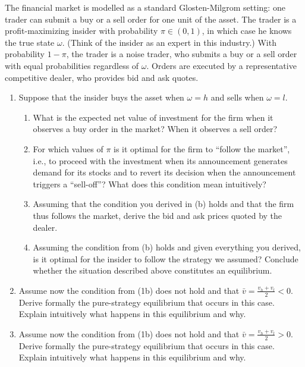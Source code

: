 	The financial market is modelled as a standard Glosten-Milgrom setting: one trader can submit a buy or a sell order for one unit of the asset. The trader is a profit-maximizing insider with probability $\pi \in (0,1)$, in which case he knows the true state $\omega$. (Think of the insider as an expert in this industry.) With probability $1-\pi$, the trader is a noise trader, who submits a buy or a sell order with equal probabilities regardless of $\omega$. Orders are executed by a representative competitive dealer, who provides bid and ask quotes.

	\begin{enumerate}
		\item 
		Suppose that the insider buys the asset when $\omega=h$ and sells when $\omega=l$. 
		\begin{enumerate}
			\item 
			What is the expected net value of investment for the firm when it observes a buy order in the market? When it observes a sell order? 
			
			\item 
			For which values of $\pi$ is it optimal for the firm to ``follow the market'', i.e., to proceed with the investment when its announcement generates demand for its stocks and to revert its decision when the announcement triggers a ``sell-off''? What does this condition mean intuitively?
			
			\item 
			Assuming that the condition you derived in (b) holds and that the firm thus follows the market, derive the bid and ask prices quoted by the dealer.
			
			\item 
			Assuming the condition from (b) holds and given everything you derived, is it optimal for the insider to follow the strategy we assumed? Conclude whether the situation described above constitutes an equilibrium.
		\end{enumerate}
		
		\item 
		Assume now the condition from (1b) does not hold and that $\bar{v} = \frac{v_h+v_l}{2} < 0$. Derive formally the pure-strategy equilibrium that occurs in this case. Explain intuitively what happens in this equilibrium and why.
		
		\item 
		Assume now the condition from (1b) does not hold and that $\bar{v} = \frac{v_h+v_l}{2} > 0$. Derive formally the pure-strategy equilibrium that occurs in this case. Explain intuitively what happens in this equilibrium and why.
	\end{enumerate}

